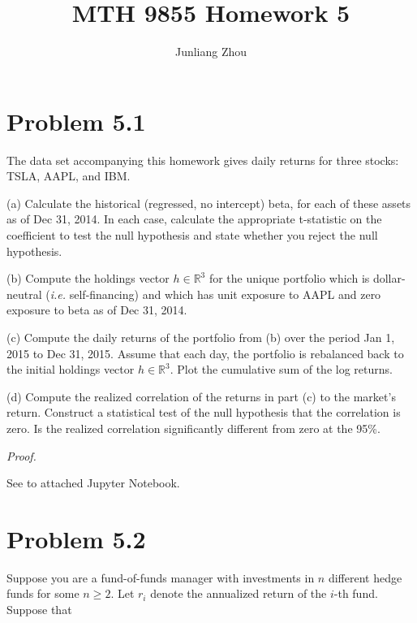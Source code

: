 \documentclass[a4paper]{article}
\title{MTH 9855 Homework 5}
\author{Junliang Zhou}
\begin{document}
\maketitle

\section{Problem 5.1}

The data set accompanying this homework gives daily returns for three stocks: TSLA, AAPL, and IBM.\newline

(a) Calculate the historical (regressed, no intercept) beta, for each of these assets as of Dec 31, 2014. In each case, calculate the appropriate t-statistic on the coefficient to test the null hypothesis and state whether you reject the null hypothesis.\newline

(b) Compute the holdings vector $h\in\mathbb{R}^3$ for the unique portfolio which is dollar-neutral (\textit{i.e.} self-financing) and which has unit exposure to AAPL and zero exposure to beta as of Dec 31, 2014.\newline

(c) Compute the daily returns of the portfolio from (b) over the period Jan 1, 2015 to Dec 31, 2015. Assume that each day, the portfolio is rebalanced back to the initial holdings vector $h\in\mathbb{R}^3$. Plot the cumulative sum of the log returns.\newline

(d) Compute the realized correlation of the returns in part (c) to the market's return. Construct a statistical test of the null hypothesis that the correlation is zero. Is the realized  correlation significantly different from zero at the 95\%.\newline

\textit{Proof.}\newline

See to attached Jupyter Notebook.\newline

\section{Problem 5.2}

Suppose you are a fund-of-funds manager with investments in $n$ different hedge funds for some $n\geq 2$. Let $r_i$ denote the annualized return of the $i$-th fund. Suppose that
\end{document}
